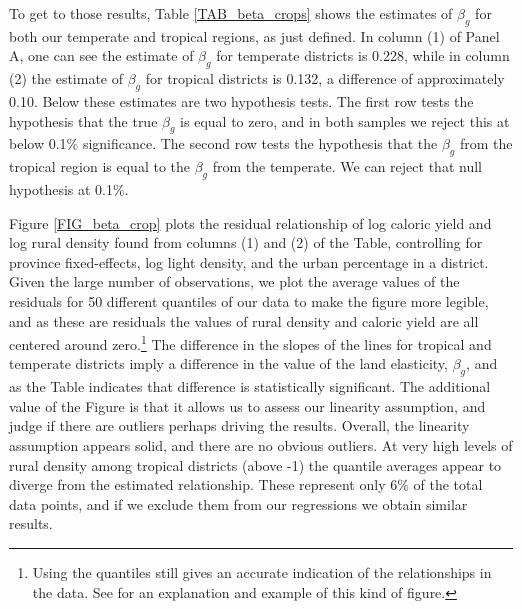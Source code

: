 \documentclass[11pt]{article}
\begin{document}
To get to those results, Table \ref{TAB_beta_crops} shows the estimates of $\beta_g$ for both our temperate and tropical regions, as just defined. In column (1) of Panel A, one can see the estimate of $\beta_g$ for temperate districts is 0.228, while in column (2) the estimate of $\beta_g$ for tropical districts is 0.132, a difference of approximately 0.10. Below these estimates are two hypothesis tests. The first row tests the hypothesis that the true $\beta_g$ is equal to zero, and in both samples we reject this at below 0.1\% significance. The second row tests the hypothesis that the $\beta_g$ from the tropical region is equal to the $\beta_g$ from the temperate. We can reject that null hypothesis at 0.1\%.

Figure \ref{FIG_beta_crop} plots the residual relationship of log caloric yield and log rural density found from columns (1) and (2) of the Table, controlling for province fixed-effects, log light density, and the urban percentage in a district. Given the large number of observations, we plot the average values of the residuals for 50 different quantiles of our data to make the figure more legible, and as these are residuals the values of rural density and caloric yield are all centered around zero.\footnote{Using the quantiles still gives an accurate indication of the relationships in the data. See \citet{cfs2013} for an explanation and example of this kind of figure.} The difference in the slopes of the lines for tropical and temperate districts imply a difference in the value of the land elasticity, $\beta_g$, and as the Table indicates that difference is statistically significant. The additional value of the Figure is that it allows us to assess our linearity assumption, and judge if there are outliers perhaps driving the results. Overall, the linearity assumption appears solid, and there are no obvious outliers. At very high levels of rural density among tropical districts (above -1) the quantile averages appear to diverge from the estimated relationship. These represent only 6\% of the total data points, and if we exclude them from our regressions we obtain similar results.
\end{document}
